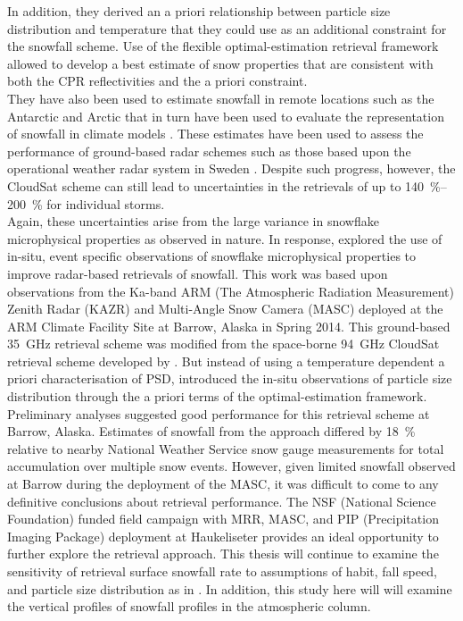 In addition, they derived an a priori relationship between particle size distribution and temperature that they could use as an additional constraint for the snowfall scheme. Use of the flexible optimal-estimation retrieval framework allowed to develop a best estimate of snow properties that are consistent with both the CPR reflectivities and the a priori constraint. 
\\
They have also been used to estimate snowfall in remote locations such as the Antarctic and Arctic \citep{palerme_how_2014,kulie_shallow_2016} that in turn have been used to evaluate the representation of snowfall in climate models \citep{palerme_evaluation_2017,christensen_arctic_2016}. 
These estimates have been used to assess the performance of ground-based radar schemes such as those based upon the operational weather radar system in Sweden \citep{norin_intercomparison_2015}. Despite such progress, however, the CloudSat scheme can still lead to uncertainties in the retrievals of up to \SIrange{140}{200}{\percent} \citep{wood_estimation_2011} for individual storms.
\\
Again, these uncertainties arise from the large variance in snowflake microphysical  properties as observed in nature. In response, \citet{cooper_variational_2017} explored the use of in-situ, event specific  observations of snowflake microphysical properties to improve radar-based retrievals of snowfall. This work was based upon observations from the Ka-band ARM (The Atmospheric Radiation Measurement) Zenith Radar (KAZR) and Multi-Angle Snow Camera (MASC) deployed at the ARM Climate Facility Site at Barrow, Alaska in Spring 2014. This ground-based \SI{35}{\giga\hertz} retrieval scheme was modified from the space-borne \SI{94}{\giga\hertz} CloudSat retrieval scheme developed by \citet{wood_estimation_2011}. But instead of using a temperature dependent a priori characterisation of PSD, \citeauthor{cooper_variational_2017} introduced the in-situ observations of particle size distribution through the a priori terms of the optimal-estimation framework. 
\\
%
Preliminary analyses suggested good performance for this retrieval scheme at Barrow, Alaska. Estimates of snowfall from the \citet{cooper_variational_2017} approach differed by \SI{18}{\percent} relative to nearby National Weather Service snow gauge measurements for total accumulation over multiple snow events. However, given limited snowfall observed at Barrow during the deployment of the MASC, it was difficult to come to any definitive conclusions about retrieval performance. The NSF (National Science Foundation) funded field campaign with MRR, MASC, and PIP (Precipitation Imaging Package) deployment at Haukeliseter provides an ideal opportunity to further explore the \citet{cooper_variational_2017} retrieval approach. This thesis will continue to examine the sensitivity of retrieval surface snowfall rate to assumptions of habit, fall speed, and particle size distribution as in \citet{cooper_variational_2017}. In addition, this study here will will examine the vertical profiles of snowfall profiles in the atmospheric column.
